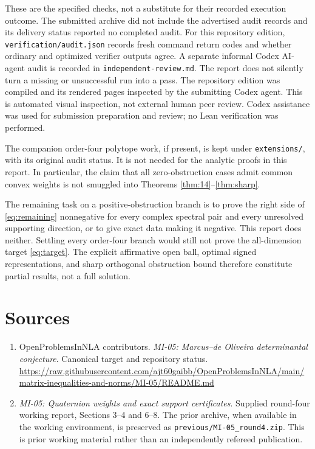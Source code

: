 \documentclass[11pt,a4paper]{article}
\begin{document}
These are the specified checks, not a substitute for their recorded execution outcome. The submitted archive did not include the advertised audit records and its delivery status reported no completed audit. For this repository edition, \texttt{verification/audit.json} records fresh command return codes and whether ordinary and optimized verifier outputs agree. A separate informal Codex AI-agent audit is recorded in \texttt{independent-review.md}. The report does not silently turn a missing or unsuccessful run into a pass. The repository edition was compiled and its rendered pages inspected by the submitting Codex agent. This is automated visual inspection, not external human peer review. Codex assistance was used for submission preparation and review; no Lean verification was performed.

The companion order-four polytope work, if present, is kept under \texttt{extensions/}, with its original audit status. It is not needed for the analytic proofs in this report. In particular, the claim that all zero-obstruction cases admit common convex weights is not smuggled into Theorems \ref{thm:14}--\ref{thm:sharp}.

The remaining task on a positive-obstruction branch is to prove the right side of \eqref{eq:remaining} nonnegative for every complex spectral pair and every unresolved supporting direction, or to give exact data making it negative. This report does neither. Settling every order-four branch would still not prove the all-dimension target \eqref{eq:target}. The explicit affirmative open ball, optimal signed representations, and sharp orthogonal obstruction bound therefore constitute partial results, not a full solution.

\section*{Sources}
\begin{enumerate}
\item OpenProblemsInNLA contributors. \emph{MI-05: Marcus--de Oliveira determinantal conjecture}. Canonical target and repository status.\newline
\url{https://raw.githubusercontent.com/ajt60gaibb/OpenProblemsInNLA/main/matrix-inequalities-and-norms/MI-05/README.md}
\item \emph{MI-05: Quaternion weights and exact support certificates}. Supplied round-four working report, Sections 3--4 and 6--8. The prior archive, when available in the working environment, is preserved as \texttt{previous/MI-05\_round4.zip}. This is prior working material rather than an independently refereed publication.
\end{enumerate}
\end{document}
